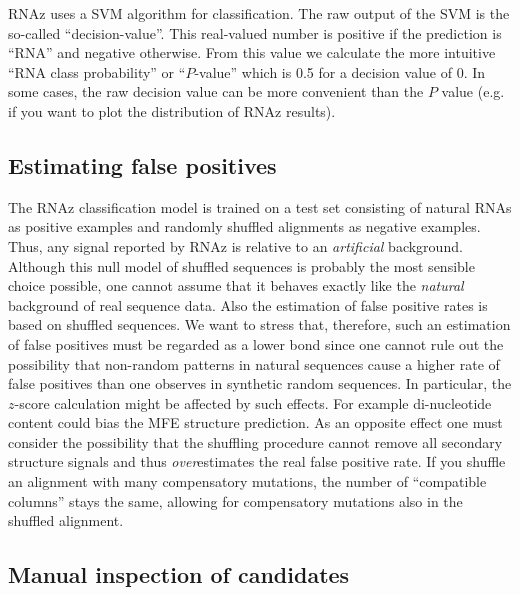 \documentclass[11pt]{article}
\begin{document}
RNAz uses a SVM algorithm for classification.  The raw output of the SVM is
the so-called ``decision-value''. This real-valued number is positive if
the prediction is ``RNA'' and negative otherwise.  From this value we
calculate the more intuitive ``RNA class probability'' or ``$P$-value''
which is 0.5 for a decision value of 0. In some cases, the raw decision
value can be more convenient than the $P$ value (e.g. if you want to plot
the distribution of RNAz results).

\subsection{Estimating false positives}
\label{sec:estim-false-posit}

The RNAz classification model is trained on a test set consisting of
natural RNAs as positive examples and randomly shuffled alignments as
negative examples. Thus, any signal reported by RNAz is relative to an
\emph{artificial} background. Although this null model of shuffled
sequences is probably the most sensible choice possible, one cannot assume
that it behaves exactly like the \emph{natural} background of real sequence
data. Also the estimation of false positive rates is based on shuffled
sequences. We want to stress that, therefore, such an estimation of false
positives must be regarded as a lower bond since one cannot rule out the
possibility that non-random patterns in natural sequences cause a higher
rate of false positives than one observes in synthetic random sequences. In
particular, the $z$-score calculation might be affected by such effects.
For example di-nucleotide content could bias the MFE structure prediction.
As an opposite effect one must consider the possibility that the shuffling
procedure cannot remove all secondary structure signals and thus
\emph{over}estimates the real false positive rate. If you shuffle an
alignment with many compensatory mutations, the number of ``compatible
columns'' stays the same, allowing for compensatory mutations also in the
shuffled alignment.

\subsection{Manual inspection of candidates}
\label{sec:filt-sign-hits}
\end{document}
